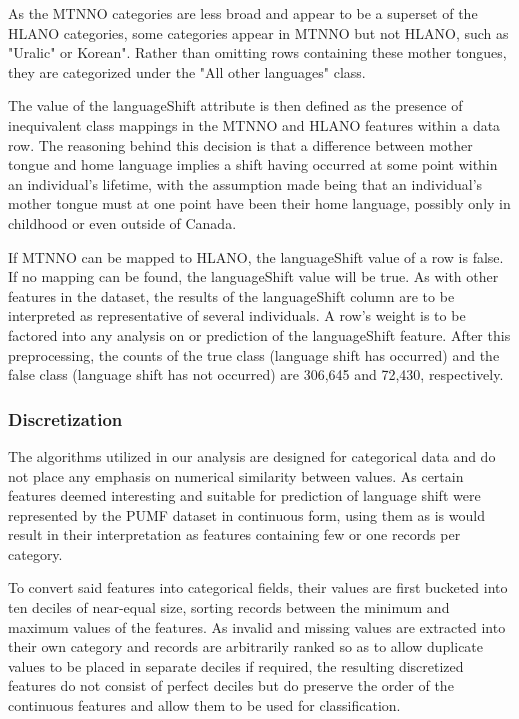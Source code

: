 \documentclass[10pt, conference, compsocconf]{IEEEtran}
\begin{document}
As the MTNNO categories are less broad and appear to be a superset of the HLANO categories, some categories appear in MTNNO but not HLANO, such as "Uralic" or Korean".  Rather than omitting rows containing these mother tongues, they are categorized under the "All other languages" class.

The value of the languageShift attribute is then defined as the presence of inequivalent class mappings in the MTNNO and HLANO features within a data row.  The reasoning behind this decision is that a difference between mother tongue and home language implies a shift having occurred at some point within an individual's lifetime, with the assumption made being that an individual's mother tongue must at one point have been their home language, possibly only in childhood or even outside of Canada.

If MTNNO can be mapped to HLANO, the languageShift value of a row is false.  If no mapping can be found, the languageShift value will be true.  As with other features in the dataset, the results of the languageShift column are to be interpreted as representative of several individuals.  A row's weight is to be factored into any analysis on or prediction of the languageShift feature. After this preprocessing, the counts of the true class (language shift has occurred) and the false class (language shift has not occurred) are 306,645 and 72,430, respectively. 

\subsubsection{Discretization}

The algorithms utilized in our analysis are designed for categorical data and do not place any emphasis on numerical similarity between values.  As certain features deemed interesting and suitable for prediction of language shift were represented by the PUMF dataset in continuous form, using them as is would result in their interpretation as features containing few or one records per category.

To convert said features into categorical fields, their values are first bucketed into ten deciles of near-equal size, sorting records between the minimum and maximum values of the features.  As invalid and missing values are extracted into their own category and records are arbitrarily ranked so as to allow duplicate values to be placed in separate deciles if required, the resulting discretized features do not consist of perfect deciles but do preserve the order of the continuous features and allow them to be used for classification. 
\end{document}
